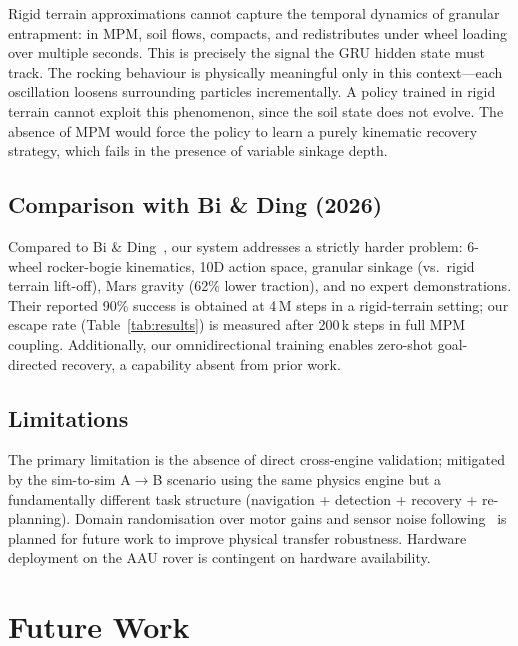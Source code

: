 \documentclass[conference]{IEEEtran}
\begin{document}
Rigid terrain approximations cannot capture the temporal dynamics of granular
entrapment: in MPM, soil flows, compacts, and redistributes under wheel loading
over multiple seconds. This is precisely the signal the GRU hidden state must
track. The rocking behaviour is physically meaningful only in this context---each
oscillation loosens surrounding particles incrementally. A policy trained in
rigid terrain cannot exploit this phenomenon, since the soil state does not
evolve. The absence of MPM would force the policy to learn a purely kinematic
recovery strategy, which fails in the presence of variable sinkage depth. \subsection{Comparison with Bi \& Ding (2026)}

Compared to Bi \& Ding~\cite{bi2026escape}, our system addresses a strictly
harder problem: 6-wheel rocker-bogie kinematics, 10D action space, granular
sinkage (vs.~rigid terrain lift-off), Mars gravity (62\% lower traction), and no
expert demonstrations. Their reported 90\% success is obtained at 4\,M steps in
a rigid-terrain setting; our escape rate (Table~\ref{tab:results}) is measured
after 200\,k steps in full MPM coupling. Additionally, our omnidirectional
training enables zero-shot goal-directed recovery, a capability absent from prior
work. \subsection{Limitations}

The primary limitation is the absence of direct cross-engine validation; mitigated by the sim-to-sim A$\to$B scenario using the same physics engine but
a fundamentally different task structure (navigation + detection + recovery +
re-planning). Domain randomisation over motor gains and sensor noise
following~\cite{tobin2017domainrand,andrychowicz2020learning} is planned for
future work to improve physical transfer robustness. Hardware deployment on the
AAU rover is contingent on hardware availability. %
\section{Future Work}
\label{sec:future}
\end{document}
